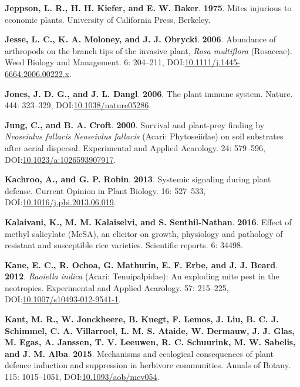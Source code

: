 \documentclass[12pt,final,CPage]{ufthesis}
\newlength{\cslhangindent}
\newenvironment{CSLReferences}[2] %
{%
	\setlength{\parindent}{0pt}
	\ifodd #1 \everypar{\setlength{\hangindent}{\cslhangindent}}\ignorespaces\fi
	\ifnum #2 > 0
	\setlength{\parskip}{#2\baselineskip}
	\fi
}%
{}
\begin{document}
{\begin{CSLReferences}{1}{0}
  \leavevmode{}%
  \textbf{Jeppson, L. R., H. H. Kiefer, and E. W. Baker}. \textbf{1975}. Mites injurious to economic plants. University of California Press, Berkeley.

  \leavevmode{}%
  \textbf{Jesse, L. C., K. A. Moloney, and J. J. Obrycki}. \textbf{2006}. Abundance of arthropods on the branch tips of the invasive plant, {\emph{Rosa multiflora}} ({Rosaceae}). Weed Biology and Management. 6: 204--211, DOI:\href{https://doi.org/10.1111/j.1445-6664.2006.00222.x}{10.1111/j.1445-6664.2006.00222.x}.

  \leavevmode{}%
  \textbf{Jones, J. D. G., and J. L. Dangl}. \textbf{2006}. The plant immune system. Nature. 444: 323--329, DOI:\href{https://doi.org/10.1038/nature05286}{10.1038/nature05286}.

  \leavevmode{}%
  \textbf{Jung, C., and B. A. Croft}. \textbf{2000}. Survival and plant-prey finding by {\emph{Neoseiulus fallacis}} {\emph{Neoseiulus fallacis}} ({Acari}: {Phytoseiidae}) on soil substrates after aerial dispersal. Experimental and Applied Acarology. 24: 579--596, DOI:\href{https://doi.org/10.1023/a:1026593907917}{10.1023/a:1026593907917}.

  \leavevmode{}%
  \textbf{Kachroo, A., and G. P. Robin}. \textbf{2013}. Systemic signaling during plant defense. Current Opinion in Plant Biology. 16: 527--533, DOI:\href{https://doi.org/10.1016/j.pbi.2013.06.019}{10.1016/j.pbi.2013.06.019}.

  \leavevmode{}%
  \textbf{Kalaivani, K., M. M. Kalaiselvi, and S. Senthil-Nathan}. \textbf{2016}. Effect of methyl salicylate {(MeSA)}, an elicitor on growth, physiology and pathology of resistant and susceptible rice varieties. Scientific reports. 6: 34498.

  \leavevmode{}%
  \textbf{Kane, E. C., R. Ochoa, G. Mathurin, E. F. Erbe, and J. J. Beard}. \textbf{2012}. {\emph{Raoiella indica}} ({Acari}: {Tenuipalpidae}): An exploding mite pest in the neotropics. Experimental and Applied Acarology. 57: 215--225, DOI:\href{https://doi.org/10.1007/s10493-012-9541-1}{10.1007/s10493-012-9541-1}.

  \leavevmode{}%
  \textbf{Kant, M. R., W. Jonckheere, B. Knegt, F. Lemos, J. Liu, B. C. J. Schimmel, C. A. Villarroel, L. M. S. Ataide, W. Dermauw, J. J. Glas, M. Egas, A. Janssen, T. V. Leeuwen, R. C. Schuurink, M. W. Sabelis, and J. M. Alba}. \textbf{2015}. Mechanisms and ecological consequences of plant defence induction and suppression in herbivore communities. Annals of Botany. 115: 1015--1051, DOI:\href{https://doi.org/10.1093/aob/mcv054}{10.1093/aob/mcv054}.


\end{CSLReferences}}
\end{document}
